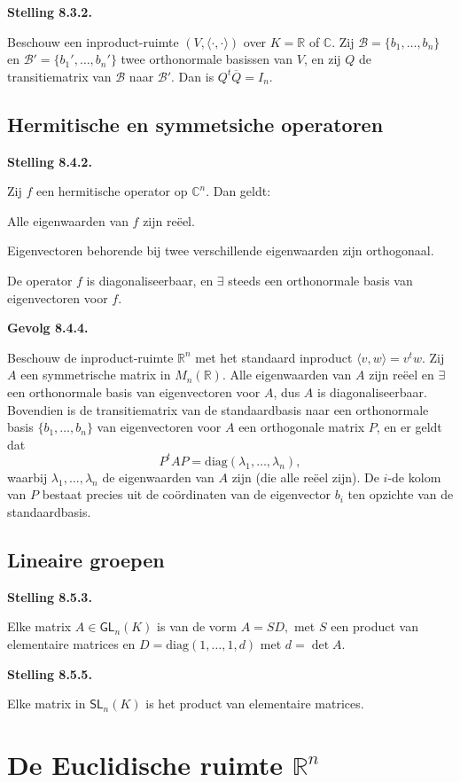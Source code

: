 \documentclass[10pt,a4paper]{article}
\newenvironment{res}[2]{%
  \par\noindent\textbf{#1 #2.}%
}{%
  \par\vspace{2pt}\normalfont
}
\begin{document}
\begin{res}{Stelling}{8.3.2}
Beschouw een inproduct-ruimte $(V,\langle\cdot,\cdot\rangle)$ over $K=\mathbb R$ of $\mathbb C$.
Zij $\mathcal B=\{b_1,\dots,b_n\}$ en $\mathcal B'=\{b_1',\dots,b_n'\}$ twee orthonormale basissen van $V$,
en zij $Q$ de transitiematrix van $\mathcal B$ naar $\mathcal B'$.
Dan is $Q^t\overline{Q}=I_n$.
\end{res}
\subsection{Hermitische en symmetsiche operatoren}
\begin{res}{Stelling}{8.4.2}
Zij $f$ een hermitische operator op $\mathbb C^n$. Dan geldt:
\begin{myenum}
\item Alle eigenwaarden van $f$ zijn re\"eel.
\item Eigenvectoren behorende bij twee verschillende eigenwaarden zijn orthogonaal.
\item De operator $f$ is diagonaliseerbaar, en \(\exists\) steeds een orthonormale basis van eigenvectoren voor $f$.
\end{myenum}
\end{res}

\begin{res}{Gevolg}{8.4.4}
Beschouw de inproduct-ruimte $\mathbb R^n$ met het standaard inproduct $\langle v,w\rangle=v^tw$. Zij $A$ een symmetrische matrix in $M_n(\mathbb R)$.
Alle eigenwaarden van $A$ zijn re\"eel en \(\exists\) een orthonormale basis van eigenvectoren voor $A$, dus $A$ is diagonaliseerbaar.
Bovendien is de transitiematrix van de standaardbasis naar een orthonormale basis $\{b_1,\dots,b_n\}$ van eigenvectoren voor $A$ een orthogonale matrix $P$, en er geldt dat
\[
P^tAP=\mathrm{diag}(\lambda_1,\dots,\lambda_n),
\]
waarbij $\lambda_1,\dots,\lambda_n$ de eigenwaarden van $A$ zijn (die alle re\"eel zijn). De $i$-de kolom van $P$ bestaat precies uit de co\"ordinaten van de eigenvector $b_i$ ten opzichte van de standaardbasis.
\end{res}
\subsection{Lineaire groepen}
\begin{res}{Stelling}{8.5.3}
Elke matrix $A\in \mathsf{GL}_n(K)$ is van de vorm
\(
A=SD,
\)
met $S$ een product van elementaire matrices en $D=\mathrm{diag}(1,\dots,1,d)$ met $d=\det A$.
\end{res}

\begin{res}{Stelling}{8.5.5}
Elke matrix in $\mathsf{SL}_n(K)$ is het product van elementaire matrices.
\end{res}

\section{De Euclidische ruimte $\mathbb R^n$}
\end{document}
